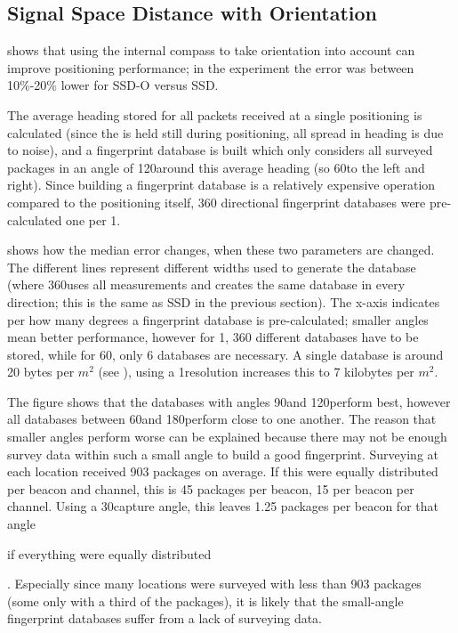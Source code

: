 \subsection{Signal Space Distance with Orientation}
\label{sec:architecture-measurements-ssd-o}
 shows that using the internal compass to take orientation into account can improve positioning performance; in the experiment the error was between 10\%-20\% lower for SSD-O versus SSD.

The average heading stored for all packets received at a single positioning is calculated (since the \device is held still during positioning, all spread in heading is due to noise), and a fingerprint database is built which only considers all surveyed packages in an angle of 120\textdegree around this average heading (so 60\textdegree to the left and right).
Since building a fingerprint database is a relatively expensive operation compared to the positioning itself, 360 directional fingerprint databases were pre-calculated one per 1\textdegree.

 shows how the median error changes, when these two parameters are changed.
The different lines represent different widths used to generate the database (where 360\textdegree uses all measurements and creates the same database in every direction; this is the same as SSD in the previous section).
The x-axis indicates per how many degrees a fingerprint database is pre-calculated; smaller angles mean better performance, however for 1\textdegree, 360 different databases have to be stored, while for 60\textdegree, only 6 databases are necessary.
A single database is around 20 bytes per $m^2$ (see ), using a 1\textdegree resolution increases this to 7 kilobytes per $m^2$.

The figure shows that the databases with angles 90\textdegree and 120\textdegree perform best, however all databases between 60\textdegree and 180\textdegree perform close to one another.
The reason that smaller angles perform worse can be explained because there may not be enough survey data within such a small angle to build a good fingerprint.
Surveying at each location received 903 packages on average.
If this were equally distributed per beacon and channel, this is 45 packages per beacon, 15 per beacon per channel.
Using a 30\textdegree capture angle, this leaves 1.25 packages per beacon for that angle \begin{em}if everything were equally distributed\end{em}.
Especially since many locations were surveyed with less than 903 packages (some only with a third of the packages), it is likely that the small-angle fingerprint databases suffer from a lack of surveying data.

